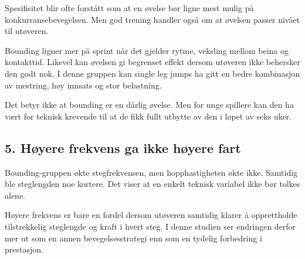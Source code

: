 Spesifisitet blir ofte forstått som at en øvelse bør ligne mest mulig på konkurransebevegelsen. Men god trening handler også om at øvelsen passer nivået til utøveren.

Bounding ligner mer på sprint når det gjelder rytme, veksling mellom beina og kontakttid. Likevel kan øvelsen gi begrenset effekt dersom utøveren ikke behersker den godt nok. I denne gruppen kan single leg jumps ha gitt en bedre kombinasjon av mestring, høy innsats og stor belastning.

Det betyr ikke at bounding er en dårlig øvelse. Men for unge spillere kan den ha vært for teknisk krevende til at de fikk fullt utbytte av den i løpet av seks uker.

\subsection{5. Høyere frekvens ga ikke høyere fart}\label{huxf8yere-frekvens-ga-ikke-huxf8yere-fart}

Bounding-gruppen økte stegfrekvensen, men hopphastigheten økte ikke. Samtidig ble steglengden noe kortere. Det viser at en enkelt teknisk variabel ikke bør tolkes alene.

Høyere frekvens er bare en fordel dersom utøveren samtidig klarer å opprettholde tilstrekkelig steglengde og kraft i hvert steg. I denne studien ser endringen derfor mer ut som en annen bevegelsesstrategi enn som en tydelig forbedring i prestasjon.


